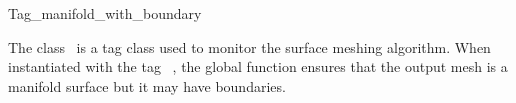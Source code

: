 

\begin{ccRefClass}{Tag_manifold_with_boundary}  %


\ccDefinition
  
The class \ccRefName\ is a tag class used to monitor the
surface meshing algorithm. When instantiated with the tag
\ccRefName\ , the global function 
ensures that the output mesh  is a  manifold surface
but it may have boundaries.










\ccSeeAlso

 \\
 \\




\end{ccRefClass}


